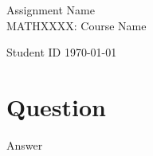 \documentclass[a4paper, 11pt]{article}
\newcommand{\hln}{\vspace{-6mm}\begin{flushleft}\mbox{}\hrulefill\mbox{}\end{flushleft}\vspace{-6mm}}
\newcommand{\hsurround}[1]{\hln #1 \vspace{-6pt} \hln}
\theoremstyle{plain}
\theoremstyle{definition}
\begin{document}
	\pagestyle{fancy}
	\begin{center}
		Assignment Name\\
		
		MATHXXXX: Course Name
		
		\hsurround{Student ID \hfill \today}
	\end{center}

\section*{Question}
Answer
\end{document}
